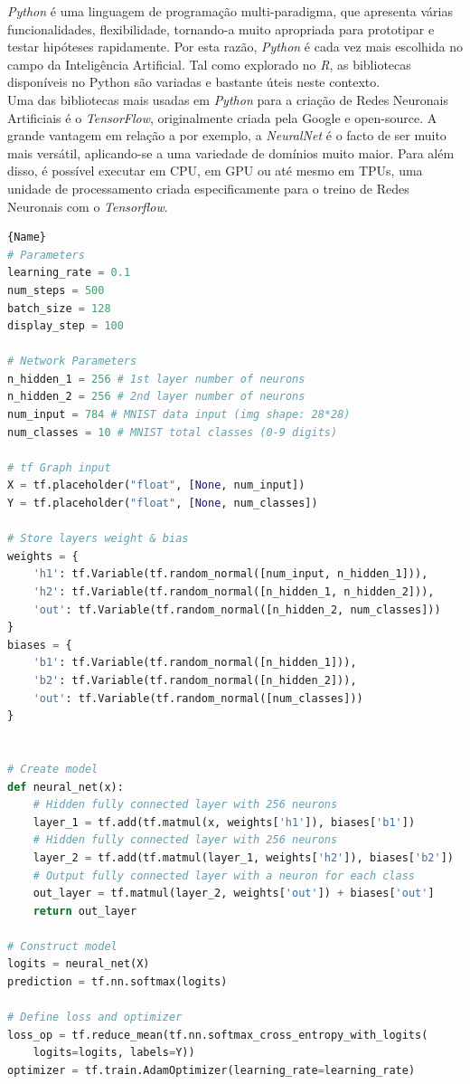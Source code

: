 \textit{Python} é uma linguagem de programação multi-paradigma, que apresenta várias funcionalidades, flexibilidade, tornando-a muito apropriada para prototipar e testar hipóteses rapidamente. Por esta razão, \textit{Python} é cada vez mais escolhida no campo da Inteligência Artificial. Tal como explorado no \textit{R}, as bibliotecas disponíveis no Python são variadas e bastante úteis neste contexto.
\\Uma das bibliotecas mais usadas em \textit{Python} para a criação de Redes Neuronais Artificiais é o \textit{TensorFlow}, originalmente criada pela Google e open-source. A grande vantagem em relação a por exemplo, a \textit{NeuralNet} é o facto de ser muito mais versátil, aplicando-se a uma variedade de domínios muito maior. Para além disso, é possível executar em CPU, em GPU ou até mesmo em TPUs, uma unidade de processamento criada especificamente para o treino de Redes Neuronais com o \textit{Tensorflow}.

\begin{lstlisting}[breaklines,caption=TensorFlow,frame=tlrb,language=python]{Name}
# Parameters
learning_rate = 0.1
num_steps = 500
batch_size = 128
display_step = 100

# Network Parameters
n_hidden_1 = 256 # 1st layer number of neurons
n_hidden_2 = 256 # 2nd layer number of neurons
num_input = 784 # MNIST data input (img shape: 28*28)
num_classes = 10 # MNIST total classes (0-9 digits)

# tf Graph input
X = tf.placeholder("float", [None, num_input])
Y = tf.placeholder("float", [None, num_classes])

# Store layers weight & bias
weights = {
    'h1': tf.Variable(tf.random_normal([num_input, n_hidden_1])),
    'h2': tf.Variable(tf.random_normal([n_hidden_1, n_hidden_2])),
    'out': tf.Variable(tf.random_normal([n_hidden_2, num_classes]))
}
biases = {
    'b1': tf.Variable(tf.random_normal([n_hidden_1])),
    'b2': tf.Variable(tf.random_normal([n_hidden_2])),
    'out': tf.Variable(tf.random_normal([num_classes]))
}


# Create model
def neural_net(x):
    # Hidden fully connected layer with 256 neurons
    layer_1 = tf.add(tf.matmul(x, weights['h1']), biases['b1'])
    # Hidden fully connected layer with 256 neurons
    layer_2 = tf.add(tf.matmul(layer_1, weights['h2']), biases['b2'])
    # Output fully connected layer with a neuron for each class
    out_layer = tf.matmul(layer_2, weights['out']) + biases['out']
    return out_layer

# Construct model
logits = neural_net(X)
prediction = tf.nn.softmax(logits)

# Define loss and optimizer
loss_op = tf.reduce_mean(tf.nn.softmax_cross_entropy_with_logits(
    logits=logits, labels=Y))
optimizer = tf.train.AdamOptimizer(learning_rate=learning_rate)
\end{lstlisting}

